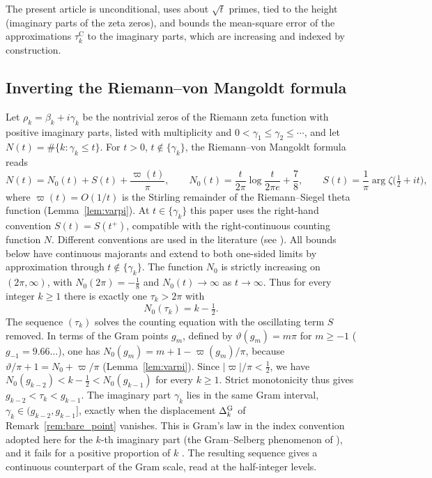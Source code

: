 \documentclass[11pt,a4paper]{article}
\makeatletter
\numberwithin{equation}{section}
\DeclareRobustCommand{\CGref}[1]{\ref{#1}}
\DeclareRobustCommand{\CGcite}[2][]{\if\relax\detokenize{#1}\relax\cite{#2}\else\cite[#1]{#2}\fi}
\let\CG@origref\ref
\newcommand{\CG@gettip}[1]{\@ifundefined{CGTip@#1}{#1}{\csname CGTip@#1\endcsname}}
\newcommand{\CG@getbib}[1]{\@ifundefined{CGBib@#1}{#1}{\csname CGBib@#1\endcsname}}
\DeclareRobustCommand{\CGref}[1]{\pdftooltip{\CG@origref{#1}}{\CG@gettip{#1}}}
\DeclareRobustCommand{\CGcite}[2][]{\pdftooltip{\if\relax\detokenize{#1}\relax\cite{#2}\else\cite[#1]{#2}\fi}{\CG@getbib{#2}}}
\theoremstyle{definition}
\theoremstyle{remark}
\newcommand{\Nz}{N_0} %
\makeatother
\begin{document}
The present article is unconditional, uses about $\sqrt t$ primes, tied to the height (imaginary parts of the zeta zeros), and bounds the mean-square error of the approximations $\tau_{k}^{\mathrm C}$ to the imaginary parts, which are increasing and indexed by construction.

\subsection{Inverting the Riemann--von Mangoldt formula}\label{subsec:tau_intro}
Let $\rho_k=\beta_k+i\gamma_k$ be the nontrivial zeros of the Riemann zeta function with positive imaginary parts, listed with multiplicity and $0<\gamma_1\le\gamma_2\le\cdots$, and let $N(t)=\#\{k:\gamma_k\le t\}$. For $t>0$, $t\notin\{\gamma_k\}$, the Riemann--von Mangoldt formula reads \CGcite[\S9.3]{Titchmarsh1986}
\begin{equation}
N(t)=\Nz(t)+S(t)+\frac{\varpi(t)}\pi,\qquad \Nz(t)=\frac t{2\pi}\log\frac t{2\pi e}+\frac78,\qquad S(t)=\frac1\pi\arg\zeta\bigl(\tfrac12+it\bigr),
\label{eq:intro_RvM}
\end{equation}
where $\varpi(t)=O(1/t)$ is the Stirling remainder of the Riemann--Siegel theta function (Lemma~\CGref{lem:varpi}). At $t\in\{\gamma_k\}$ this paper uses the right-hand convention $S(t)=S(t^+)$, compatible with the right-continuous counting function $N$. Different conventions are used in the literature (see \CGcite[\S9.3]{Titchmarsh1986}). All bounds below have continuous majorants and extend to both one-sided limits by approximation through $t\notin\{\gamma_k\}$. The function $\Nz$ is strictly increasing on $(2\pi,\infty)$, with $\Nz(2\pi)=-\frac18$ and $\Nz(t)\to\infty$ as $t\to\infty$. Thus for every integer $k\ge1$ there is exactly one $\tau_k>2\pi$ with
\begin{equation}
\Nz(\tau_k)=k-\tfrac12 .
\label{eq:intro_tau}
\end{equation}
The sequence $(\tau_k)$ solves the counting equation with the oscillating term $S$ removed. In terms of the Gram points $g_m$, defined by $\vartheta(g_m)=m\pi$ for $m\ge-1$ ($g_{-1}=9.66\ldots$), one has $\Nz(g_m)=m+1-\varpi(g_m)/\pi$, because $\vartheta/\pi+1=\Nz+\varpi/\pi$ (Lemma~\CGref{lem:varpi}). Since $|\varpi|/\pi<\frac12$, we have $\Nz(g_{k-2})<k-\frac12<\Nz(g_{k-1})$ for every $k\ge1$. Strict monotonicity thus gives $g_{k-2}<\tau_k<g_{k-1}$. The imaginary part $\gamma_k$ lies in the same Gram interval, $\gamma_k\in(g_{k-2},g_{k-1}]$, exactly when the displacement $\Delta^{\rm G}_k$ of Remark~\CGref{rem:bare_point} vanishes. This is Gram's law in the index convention adopted here for the $k$-th imaginary part (the Gram--Selberg phenomenon of \CGcite[Def.~1.4]{Korolev2012}), and it fails for a positive proportion of $k$ \CGcite[p.~58]{Korolev2012}. The resulting sequence gives a continuous counterpart of the Gram scale, read at the half-integer levels.
\end{document}
